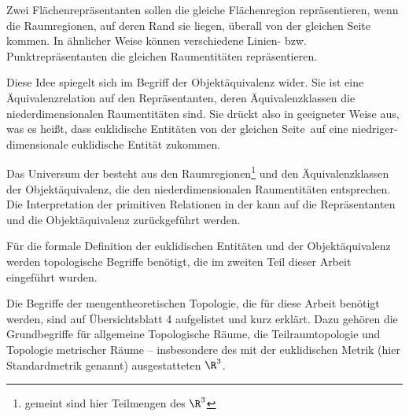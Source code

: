     Zwei
    Flächenrepräsentanten sollen die gleiche Flächenregion repräsentieren, wenn die Raumregionen, auf deren Rand sie liegen, überall 
    \glqq von der gleichen Seite kommen\grqq.
    In ähnlicher Weise können verschiedene Linien- bzw. Punktrepräsentanten die gleichen Raumentitäten repräsentieren.
    
    Diese Idee spiegelt sich im Begriff der Objektäquivalenz wider. 
    Sie ist eine Äquivalenzrelation auf den Repräsentanten, deren Äquivalenzklassen die niederdimensionalen Raumentitäten sind.
    Sie drückt also in geeigneter Weise aus, was es heißt, dass euklidische Entitäten \glqq von der gleichen Seite\grqq\ auf eine niedriger-dimensionale euklidische Entität zukommen.
    
    Das
    Universum der \strukt besteht aus den Raumregionen\footnote{gemeint sind hier Teilmengen des $\R^3$} und den Äquivalenzklassen der Objektäquivalenz, die den niederdimensionalen Raumentitäten entsprechen.
    Die Interpretation der primitiven Relationen  in der \strukt kann auf die Repräsentanten und die Objektäquivalenz zurückgeführt werden.
    
    Für
    die formale Definition der euklidischen Entitäten und der Objektäquivalenz werden topologische Begriffe benötigt, die im zweiten Teil dieser Arbeit eingeführt wurden.
    
    Die
    Begriffe der mengentheoretischen Topologie, die für diese Arbeit benötigt werden, sind auf Übersichtsblatt 4 aufgelistet und kurz erklärt.
    Dazu gehören die Grundbegriffe für allgemeine Topologische Räume, die Teilraumtopologie und Topologie metrischer Räume -- insbesondere des mit der euklidischen Metrik (hier Standardmetrik genannt) ausgestatteten $\R^3$.
    
